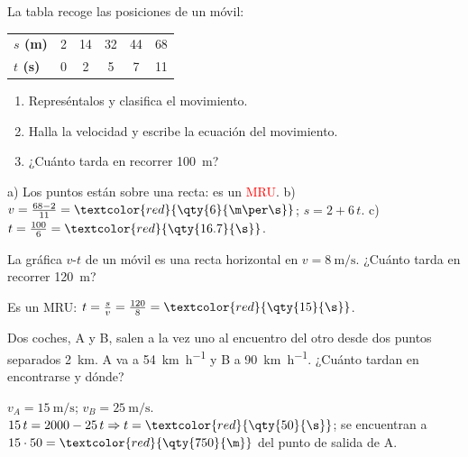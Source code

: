 \begin{exercise}
    La tabla recoge las posiciones de un móvil:
    \begin{center}
        \begin{tabular}{@{}lccccc@{}}
            \toprule
            \textbf{\(s\) (\unit{\m})} & 2 & 14 & 32 & 44 & 68 \\[3pt]
            \textbf{\(t\) (\unit{\s})} & 0 & 2 & 5 & 7 & 11 \\
            \bottomrule
        \end{tabular}
    \end{center}
    \begin{enumerate}[label=\alph*)]
        \item Represéntalos y clasifica el movimiento.
        \item Halla la velocidad y escribe la ecuación del movimiento.
        \item ¿Cuánto tarda en recorrer \qty{100}{\m}?
    \end{enumerate}
    \begin{solu}
        a) Los puntos están sobre una recta: es un \textcolor{red}{MRU}.
        b) \(v = \frac{68 - 2}{11} = \textcolor{red}{\qty{6}{\m\per\s}}\); \(s = 2 + 6\,t\).
        c) \(t = \frac{100}{6} = \textcolor{red}{\qty{16.7}{\s}}\).
    \end{solu}
\end{exercise}

\begin{exercise}
    La gráfica \(v\)-\(t\) de un móvil es una recta horizontal en \(v = \qty{8}{\m\per\s}\). ¿Cuánto tarda en recorrer \qty{120}{\m}?
    \begin{solu}
        Es un MRU: \(t = \frac{s}{v} = \frac{120}{8} = \textcolor{red}{\qty{15}{\s}}\).
    \end{solu}
\end{exercise}

\begin{exercise}
    Dos coches, A y B, salen a la vez uno al encuentro del otro desde dos puntos separados \qty{2}{\km}. A va a \qty{54}{\km\per\hour} y B a \qty{90}{\km\per\hour}. ¿Cuánto tardan en encontrarse y dónde?
    \begin{solu}
        \(v_A = \qty{15}{\m\per\s}\); \(v_B = \qty{25}{\m\per\s}\). \(15\,t = 2000 - 25\,t \Rightarrow t = \textcolor{red}{\qty{50}{\s}}\); se encuentran a \(15 \cdot 50 = \textcolor{red}{\qty{750}{\m}}\) del punto de salida de A.
    \end{solu}
\end{exercise}

